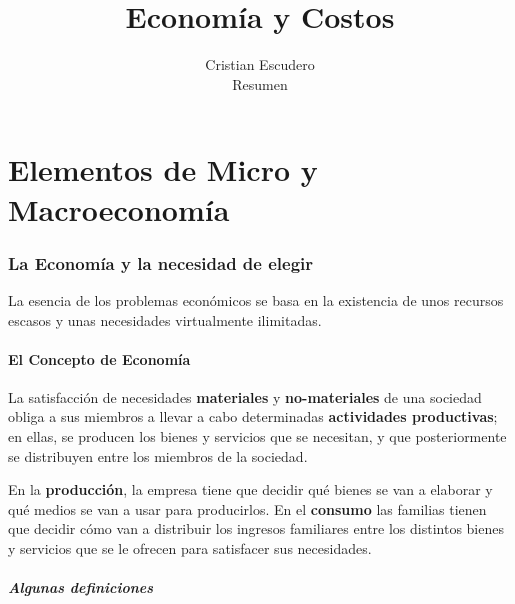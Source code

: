 \documentclass[10pt,a4paper]{article}
\title{Economía y Costos}
\author{Cristian Escudero \\ \small{Resumen}}
\begin{document}
\maketitle

\part{Elementos de Micro y Macroeconomía}
\section{La Economía y la necesidad de elegir}

La esencia de los problemas económicos se basa en la existencia de unos recursos escasos y unas necesidades virtualmente ilimitadas.

\subsection{El Concepto de Economía}

La satisfacción de necesidades \textbf{materiales} y \textbf{no-materiales} de una sociedad obliga a sus miembros a llevar a cabo determinadas \textbf{actividades productivas}; en ellas, se producen los bienes y servicios que se necesitan, y que posteriormente se distribuyen entre los miembros de la sociedad.

En la \textbf{producción}, la empresa tiene que decidir qué bienes se van a elaborar y qué medios se van a usar para producirlos. En el \textbf{consumo} las familias  tienen que decidir cómo van a distribuir los ingresos familiares entre los distintos bienes y servicios que se le ofrecen para satisfacer sus necesidades.

\subsubsection{Algunas definiciones}
\end{document}
